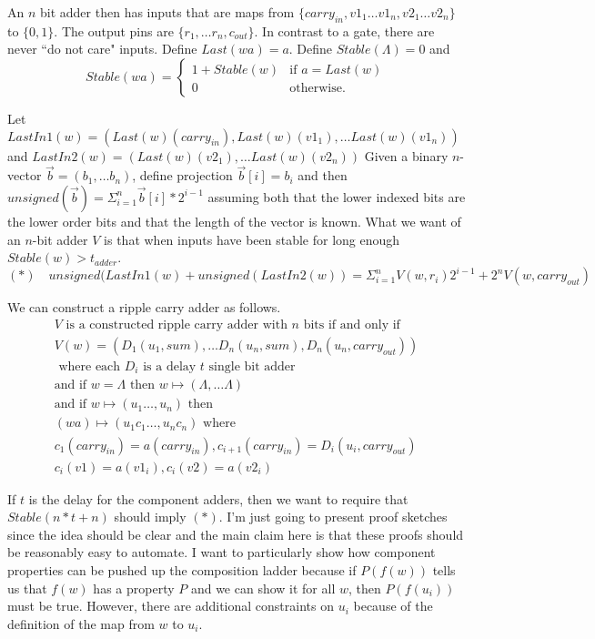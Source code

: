 \documentclass[runningheads,letter]{llncs}
\newcommand{\set}[1]{\{#1\}}
\newcommand{\ess}{\Lambda}
\newcommand{\Bfunc}{\left\{\begin{array}{ll}}
\newcommand{\Efunc}{\end{array}\right.}
\begin{document}
An $n$ bit  adder then has inputs that are maps from 
$\set{ carry_{in}, v1_1\dots v1_n,v2_1\dots v2_n}$ to $\set{0,1}$.  The output pins are $\set{r_1,\dots r_n,c_{out}}$. In contrast to a gate, there are never
``do not care" inputs. Define $Last(wa)=a$. Define $Stable(\ess)=0$
and 
\[Stable(wa) = \Bfunc
		1+Stable(w)&\mbox{if }a=Last(w)\\
		0&\mbox{otherwise}.\Efunc \]

Let
$LastIn1(w)=(Last(w)(carry_{in}),Last(w)(v1_1),\dots Last(w)(v1_n))$
and $LastIn2(w)=(Last(w)(v2_1),\dots Last(w)(v2_n))$
Given a binary $n$-vector $\vec{b}=(b_1,\dots b_n)$, define projection $\vec{b}[i] = b_i$ and
then $unsigned(\vec{b}) = \Sigma_{i=1}^n \vec{b}[i]*2^{i-1}$ assuming both that the lower indexed bits
are the lower order bits and that the length of the vector is known.
What we want of an $n$-bit adder $V$ is that
when inputs have been stable for long enough $Stable(w) >t_{adder}$.
\[(*)\quad unsigned(LastIn1(w)+unsigned(LastIn2(w)) = \Sigma_{i=1}^n V(w,r_i)2^{i-1} + 2^nV(w,carry_{out})\]

We can construct a ripple carry adder as follows.
\begin{eqnarray}
V \mbox{ is a constructed ripple carry adder with }n \mbox{ bits if and only if}\nonumber\\
V(w)=(D_1(u_1,sum),\dots D_n(u_n,sum),D_n(u_n,carry_{out}))\\
\mbox{ where each }D_i\mbox{ is a delay }t\mbox{ single bit adder}\\
\mbox{and if }w=\ess\mbox{ then }w\mapsto (\ess, \dots \ess)\\
\mbox{and if }w\mapsto (u_1\dots,u_n)\mbox{ then }\nonumber\\
(wa)\mapsto (u_1c_1\dots ,u_nc_n)\mbox{ where }\nonumber\\
c_1(carry_{in})=a(carry_{in}), c_{i+1}(carry_{in})=D_i(u_i,carry_{out})\\
c_i(v1) = a(v1_i), c_i(v2)=a(v2_i)\end{eqnarray}


If $t$ is the delay for the component adders, then 
we want to require that $Stable(n*t+n)$ should imply $(*)$.
I'm just going to present proof sketches since the idea should be clear and
the main claim here is that these proofs should be reasonably easy to 
automate. I want to particularly show how component properties can be pushed
up the composition ladder because if $P(f(w))$ tells us that $f(w)$ has a 
property $P$ and we can show it for all $w$, then $P(f(u_i))$ must be true.
However, there are additional constraints on $u_i$ because of the definition
of the map from $w$ to $u_i$.
\end{document}
